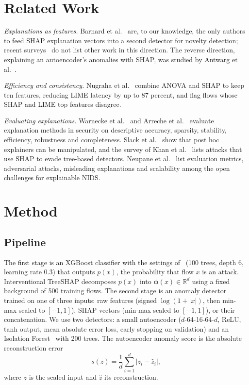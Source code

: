 \documentclass[conference]{IEEEtran}
\begin{document}
\section{Related Work}
\textit{Explanations as features.} Barnard et al.~\cite{barnard2022robust} are, to our knowledge, the only authors to feed SHAP explanation vectors into a second detector for novelty detection; recent surveys~\cite{neupane2022xids,khan2024xids} do not list other work in this direction. The reverse direction, explaining an autoencoder's anomalies with SHAP, was studied by Antwarg et al.~\cite{antwarg2021explaining}.

\textit{Efficiency and consistency.} Nugraha et al.~\cite{nugraha2025versatile} combine ANOVA and SHAP to keep ten features, reducing LIME latency by up to 87 percent, and flag flows whose SHAP and LIME top features disagree.

\textit{Evaluating explanations.} Warnecke et al.~\cite{warnecke2020evaluating} and Arreche et al.~\cite{arreche2024exai} evaluate explanation methods in security on descriptive accuracy, sparsity, stability, efficiency, robustness and completeness. Slack et al.~\cite{slack2020fooling} show that post hoc explainers can be manipulated, and the survey of Khan et al.~\cite{khan2024xids} lists attacks that use SHAP to evade tree-based detectors. Neupane et al.~\cite{neupane2022xids} list evaluation metrics, adversarial attacks, misleading explanations and scalability among the open challenges for explainable NIDS.

\section{Method}
\subsection{Pipeline}
The first stage is an XGBoost classifier with the settings of~\cite{barnard2022robust} (100 trees, depth 6, learning rate 0.3) that outputs $p(x)$, the probability that flow $x$ is an attack. Interventional TreeSHAP decomposes $p(x)$ into $\boldsymbol{\phi}(x)\in\mathbb{R}^d$ using a fixed background of 500 training flows. The second stage is an anomaly detector trained on one of three inputs: raw features (signed $\log(1+|x|)$, then min-max scaled to $[-1,1]$), SHAP vectors (min-max scaled to $[-1,1]$), or their concatenation. We use two detectors: a small autoencoder ($d$-64-16-64-$d$, ReLU, tanh output, mean absolute error loss, early stopping on validation) and an Isolation Forest~\cite{liu2008iforest} with 200 trees. The autoencoder anomaly score is the absolute reconstruction error
\begin{equation}
s(z)=\frac{1}{d}\sum_{i=1}^{d}\left|z_i-\hat{z}_i\right|,\label{eq:are}
\end{equation}
where $z$ is the scaled input and $\hat{z}$ its reconstruction.
\end{document}
